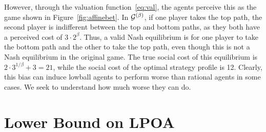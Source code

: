 \documentclass[twoside]{article}
\begin{document}
\begin{multicols}{2}
However, through the valuation function~\eqref{eq:val}, the agents perceive this
as the game shown in Figure~\ref{fig:affinebet}. In $\mathcal{G}\pbet$, if one
player takes the top path, the second player is indifferent between the top and
bottom paths, as they both have a perceived cost of $3 \cdot 2^\beta$. Thus, a
valid Nash equilibrium is for one player to take the bottom path and the other
to take the top path, even though this is not a Nash equilibrium in the original
game. The true social cost of this equilibrium is $2 \cdot 3^{1/\beta} + 3 =
21$, while the social cost of the optimal strategy profile is 12. Clearly, this
bias can induce lowball agents to perform worse than rational agents in some
cases. We seek to understand how much worse they can do.
\section{Lower Bound on LPOA} \label{sec:lb}
\begin{figure}[H]
  \centering
  \begin{subfigure}[b]{\linewidth}
    \centering
    \begin{tikzpicture} [baseline=(s.base), arc/.style={->,thick,>=stealth},
      vertex/.style={draw,circle,minimum size=.5cm},scale=1.5]


\end{tikzpicture}
\end{subfigure}
\end{figure}
\end{multicols}
\end{document}
